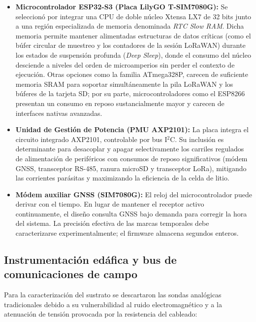 \begin{itemize}
    \item \textbf{Microcontrolador ESP32-S3 (Placa LilyGO T-SIM7080G):} Se seleccionó por integrar una CPU de doble núcleo Xtensa LX7 de 32 bits junto a una región especializada de memoria denominada \textit{RTC Slow RAM}. Dicha memoria permite mantener alimentadas estructuras de datos críticas (como el búfer circular de muestreo y los contadores de la sesión LoRaWAN) durante los estados de suspensión profunda (\textit{Deep Sleep}), donde el consumo del núcleo desciende a niveles del orden de microamperios sin perder el contexto de ejecución. Otras opciones como la familia ATmega328P, carecen de suficiente memoria SRAM para soportar simultáneamente la pila LoRaWAN y los búferes de la tarjeta SD; por su parte, microcontroladores como el ESP8266 presentan un consumo en reposo sustancialmente mayor y carecen de interfaces nativas avanzadas.

    \item \textbf{Unidad de Gestión de Potencia (PMU AXP2101):} La placa integra el circuito integrado AXP2101, controlable por bus I$^2$C. Su inclusión es determinante para desacoplar y apagar selectivamente los carriles regulados de alimentación de periféricos con consumos de reposo significativos (módem GNSS, transceptor RS-485, ranura microSD y transceptor LoRa), mitigando las corrientes parásitas y maximizando la eficiencia de la celda de litio.

    \item \textbf{Módem auxiliar GNSS (SIM7080G):} El reloj del microcontrolador puede derivar con el tiempo. En lugar de mantener el receptor activo continuamente, el diseño consulta GNSS bajo demanda para corregir la hora del sistema. La precisión efectiva de las marcas temporales debe caracterizarse experimentalmente; el firmware almacena segundos enteros.
\end{itemize}

\subsection{Instrumentación edáfica y bus de comunicaciones de campo}

Para la caracterización del sustrato se descartaron las sondas analógicas tradicionales debido a su vulnerabilidad al ruido electromagnético y a la atenuación de tensión provocada por la resistencia del cableado:


